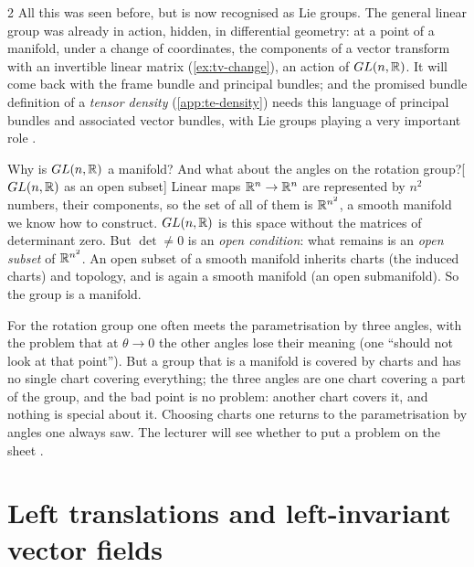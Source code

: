 \begin{paracol}{2}
All this was seen before, but is now recognised as Lie groups. The general linear group was already in action, hidden, in differential geometry: at a point of a manifold, under a change of coordinates, the components of a vector transform with an invertible linear matrix (\cref{ex:tv-change}), an action of $GL(n,\mathbb{R})$. It will come back with the frame bundle and principal bundles; and the promised bundle definition of a \emph{tensor density} (\cref{app:te-density}) needs this language of principal bundles and associated vector bundles, with Lie groups playing a very important role  .

\begin{answer}{Why is $GL(n,\mathbb{R})$ a manifold? And what about the angles on the rotation group?}[$GL(n,\mathbb{R})$ as an open subset]
Linear maps $\mathbb{R}^n\to\mathbb{R}^n$ are represented by $n^2$ numbers, their components, so the set of all of them is $\mathbb{R}^{n^2}$, a smooth manifold we know how to construct. $GL(n,\mathbb{R})$ is this space without the matrices of determinant zero. But $\det\ne0$ is an \emph{open condition}: what remains is an \emph{open subset} of $\mathbb{R}^{n^2}$. An open subset of a smooth manifold inherits charts (the induced charts) and topology, and is again a smooth manifold (an open submanifold). So the group is a manifold.   \par
For the rotation group one often meets the parametrisation by three angles, with the problem that at $\theta\to0$ the other angles lose their meaning (one ``should not look at that point''). But a group that is a manifold is covered by charts and has no single chart covering everything; the three angles are one chart covering a part of the group, and the bad point is no problem: another chart covers it, and nothing is special about it. Choosing charts one returns to the parametrisation by angles one always saw. The lecturer will see whether to put a problem on the sheet    .
\end{answer}

\section{Left translations and left-invariant vector fields}\label{sec:ll-left}


\end{paracol}
